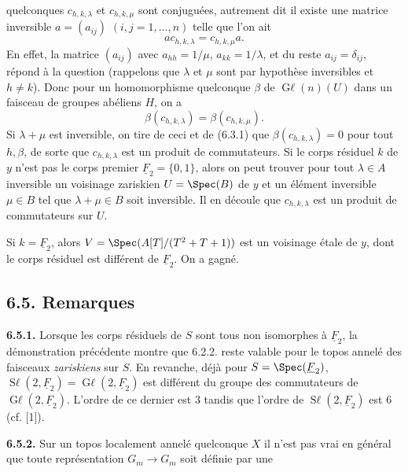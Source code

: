 
quelconques \(c_{h,k,\lambda}\) et \(c_{h,k,\mu}\) sont conjuguées, autrement dit il existe une matrice inversible \(a=(a_{ij})\) \((i,j=1,\ldots,n)\) telle que l'on ait
\[
 ac_{h,k,\lambda}=c_{h,k,\mu}a.
\]
En effet, la matrice \((a_{ij})\) avec \(a_{hh}=1/\mu\), \(a_{kk}=1/\lambda\), et du reste \(a_{ij}=\delta_{ij}\), répond à la question (rappelons que \(\lambda\) et \(\mu\) sont par hypothèse inversibles et \(h\ne k\)). Donc pour un homomorphisme quelconque \(\beta\) de \(\operatorname{G\ell}(n)(U)\) dans un faisceau de groupes abéliens \(H\), on a
\[
 \beta(c_{h,k,\lambda})=\beta(c_{h,k,\mu}).
\]
Si \(\lambda+\mu\) est inversible, on tire de ceci et de (6.3.1) que \(\beta(c_{h,k,\lambda})=0\) pour tout \(h,\beta\), de sorte que \(c_{h,k,\lambda}\) est un produit de commutateurs. Si le corps résiduel \(k\) de \(y\) n'est pas le corps premier \(\underline{F}_2=\{0,1\}\), alors on peut trouver pour tout \(\lambda\in A\) inversible un voisinage zariskien \(U=\Spec(B)\) de \(y\) et un élément inversible \(\mu\in B\) tel que \(\lambda+\mu\in B\) soit inversible. Il en découle que \(c_{h,k,\lambda}\) est un produit de commutateurs sur \(U\).

Si \(k=\underline{F}_2\), alors \(V=\Spec(A[T]/(T^2+T+1))\) est un voisinage étale de \(y\), dont le corps résiduel est différent de \(\underline{F}_2\). On a gagné.

\subsection*{6.5. Remarques}
\textbf{6.5.1.} Lorsque les corps résiduels de \(S\) sont tous non isomorphes à \(\underline{F}_2\), la démonstration précédente montre que 6.2.2. reste valable pour le topos annelé des faisceaux \emph{zariskiens} sur \(S\). En revanche, déjà pour \(S=\Spec(\underline{F}_2)\), \(\operatorname{S\ell}(2,\underline{F}_2)=\operatorname{G\ell}(2,\underline{F}_2)\) est différent du groupe des commutateurs de \(\operatorname{G\ell}(2,\underline{F}_2)\). L'ordre de ce dernier est \(3\) tandis que l'ordre de \(\operatorname{S\ell}(2,\underline{F}_2)\) est \(6\) (cf. [1]).

\textbf{6.5.2.} Sur un topos localement annelé quelconque \(X\) il n'est pas vrai en général que toute représentation \(G_m\to G_m\) soit définie par une
